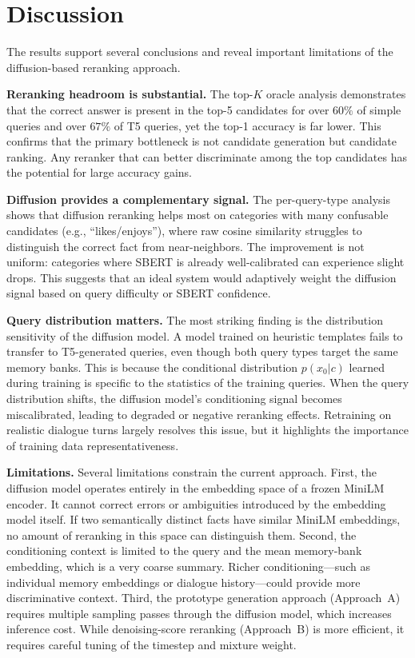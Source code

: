 \documentclass{article}
\begin{document}
\section{Discussion}
\label{sec:discussion}

The results support several conclusions and reveal important limitations of the diffusion-based reranking approach.

\textbf{Reranking headroom is substantial.} The top-$K$ oracle analysis demonstrates that the correct answer is present in the top-5 candidates for over $60\%$ of simple queries and over $67\%$ of T5 queries, yet the top-1 accuracy is far lower. This confirms that the primary bottleneck is not candidate generation but candidate ranking. Any reranker that can better discriminate among the top candidates has the potential for large accuracy gains.

\textbf{Diffusion provides a complementary signal.} The per-query-type analysis shows that diffusion reranking helps most on categories with many confusable candidates (e.g., ``likes/enjoys''), where raw cosine similarity struggles to distinguish the correct fact from near-neighbors. The improvement is not uniform: categories where SBERT is already well-calibrated can experience slight drops. This suggests that an ideal system would adaptively weight the diffusion signal based on query difficulty or SBERT confidence.

\textbf{Query distribution matters.} The most striking finding is the distribution sensitivity of the diffusion model. A model trained on heuristic templates fails to transfer to T5-generated queries, even though both query types target the same memory banks. This is because the conditional distribution $p(x_0 | c)$ learned during training is specific to the statistics of the training queries. When the query distribution shifts, the diffusion model's conditioning signal becomes miscalibrated, leading to degraded or negative reranking effects. Retraining on realistic dialogue turns largely resolves this issue, but it highlights the importance of training data representativeness.

\textbf{Limitations.} Several limitations constrain the current approach. First, the diffusion model operates entirely in the embedding space of a frozen MiniLM encoder. It cannot correct errors or ambiguities introduced by the embedding model itself. If two semantically distinct facts have similar MiniLM embeddings, no amount of reranking in this space can distinguish them. Second, the conditioning context is limited to the query and the mean memory-bank embedding, which is a very coarse summary. Richer conditioning---such as individual memory embeddings or dialogue history---could provide more discriminative context. Third, the prototype generation approach (Approach~A) requires multiple sampling passes through the diffusion model, which increases inference cost. While denoising-score reranking (Approach~B) is more efficient, it requires careful tuning of the timestep and mixture weight.
\end{document}
